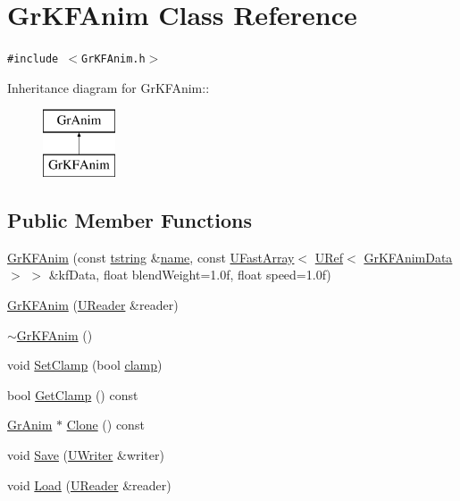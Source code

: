 \hypertarget{class_gr_k_f_anim}{
\section{GrKFAnim Class Reference}
\label{class_gr_k_f_anim}
}
{\tt \#include $<$GrKFAnim.h$>$}

Inheritance diagram for GrKFAnim::\begin{figure}[H]
\begin{center}
\leavevmode
\includegraphics[height=2cm]{class_gr_k_f_anim}
\end{center}
\end{figure}
\subsection*{Public Member Functions}
\begin{CompactItemize}
\item 
\hyperlink{class_gr_k_f_anim_cfb1ff66e711a5047085b9faf152f681}{GrKFAnim} (const \hyperlink{common__afx_8h_816fa58fd77499b0edb2c69ebe803d5c}{tstring} \&\hyperlink{glext__bak_8h_bb62efe59ccdd153ce42e1a418352209}{name}, const \hyperlink{class_u_fast_array}{UFastArray}$<$ \hyperlink{class_u_ref}{URef}$<$ \hyperlink{class_gr_k_f_anim_data}{GrKFAnimData} $>$ $>$ \&kfData, float blendWeight=1.0f, float speed=1.0f)
\item 
\hyperlink{class_gr_k_f_anim_bcd2ef342c645de6251bcc3644290e1d}{GrKFAnim} (\hyperlink{class_u_reader}{UReader} \&reader)
\item 
\hyperlink{class_gr_k_f_anim_1ed2fbe268f028e23976632df59e83e2}{$\sim$GrKFAnim} ()
\item 
void \hyperlink{class_gr_k_f_anim_6eee5e58add387a6d0356805da36af38}{SetClamp} (bool \hyperlink{glext_8h_3878d3005eeb2d2ef414abc752ba3c9b}{clamp})
\item 
bool \hyperlink{class_gr_k_f_anim_31b6c71e8e7382814e55f88a8d8f93a9}{GetClamp} () const 
\item 
\hyperlink{class_gr_anim}{GrAnim} $\ast$ \hyperlink{class_gr_k_f_anim_5392ada1053eff8dcb27fa727e107f79}{Clone} () const 
\item 
void \hyperlink{class_gr_k_f_anim_698bd445e35a2f55b87accdbf2f63f96}{Save} (\hyperlink{class_u_writer}{UWriter} \&writer)
\item 
void \hyperlink{class_gr_k_f_anim_16030b5b8f3c4711713f791ad3e937df}{Load} (\hyperlink{class_u_reader}{UReader} \&reader)
\end{CompactItemize}


